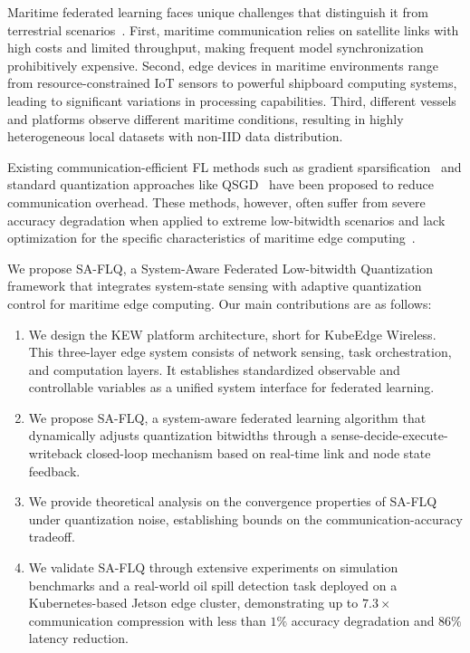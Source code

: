 \documentclass[journal]{IEEEtran}
\begin{document}
Maritime federated learning faces unique challenges that distinguish it from terrestrial scenarios~\cite{Suervey_UAV_aid_communication}. First, maritime communication relies on satellite links with high costs and limited throughput, making frequent model synchronization prohibitively expensive. Second, edge devices in maritime environments range from resource-constrained IoT sensors to powerful shipboard computing systems, leading to significant variations in processing capabilities. Third, different vessels and platforms observe different maritime conditions, resulting in highly heterogeneous local datasets with non-IID data distribution.

Existing communication-efficient FL methods such as gradient sparsification~\cite{5} and standard quantization approaches like QSGD~\cite{QSGD} have been proposed to reduce communication overhead. These methods, however, often suffer from severe accuracy degradation when applied to extreme low-bitwidth scenarios and lack optimization for the specific characteristics of maritime edge computing~\cite{lazy_aggragation}.

We propose SA-FLQ, a System-Aware Federated Low-bitwidth Quantization framework that integrates system-state sensing with adaptive quantization control for maritime edge computing. Our main contributions are as follows:

\begin{enumerate}
    \item We design the KEW platform architecture, short for KubeEdge Wireless. This three-layer edge system consists of network sensing, task orchestration, and computation layers. It establishes standardized observable and controllable variables as a unified system interface for federated learning.
    
    \item We propose SA-FLQ, a system-aware federated learning algorithm that dynamically adjusts quantization bitwidths through a sense-decide-execute-writeback closed-loop mechanism based on real-time link and node state feedback.
    
    \item We provide theoretical analysis on the convergence properties of SA-FLQ under quantization noise, establishing bounds on the communication-accuracy tradeoff.
    
    \item We validate SA-FLQ through extensive experiments on simulation benchmarks and a real-world oil spill detection task deployed on a Kubernetes-based Jetson edge cluster, demonstrating up to $7.3\times$ communication compression with less than $1\%$ accuracy degradation and $86\%$ latency reduction.
\end{enumerate}
\end{document}
